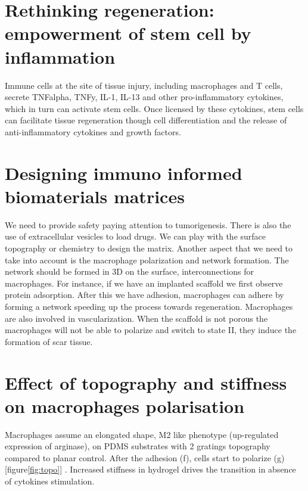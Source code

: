 \section{Rethinking regeneration: empowerment of stem cell by inflammation}
Immune cells at the site of tissue injury, including macrophages and T cells, secrete TNFalpha, TNFy, IL-1, IL-13 and other pro-inflammatory cytokines, which in turn can activate stem cells. 
Once licensed by these cytokines, stem cells can facilitate tissue regeneration though cell differentiation and the release of anti-inflammatory cytokines and growth factors.

\section{Designing immuno informed biomaterials matrices}
We need to provide safety paying attention to tumorigenesis.
There is also the use of extracellular vesicles to load drugs.
We can play with the surface topography or chemistry to design the matrix.
Another aspect that we need to take into account is the macrophage polarization and network formation.
The network should be formed in 3D on the surface, interconnections for macrophages.
For instance, if we have an implanted scaffold we first observe protein adsorption. 
After this we have adhesion, macrophages can adhere by forming a network speeding up the process towards regeneration. 
Macrophages are also involved in vascularization. 
When the scaffold is not porous the macrophages will not be able to polarize and switch to state II, they induce the formation of scar tissue.

\section{Effect of topography and stiffness on macrophages polarisation}
Macrophages assume an elongated shape, M2 like phenotype (up-regulated expression of arginase), on PDMS substrates with 2 gratings topography compared to planar control.
After the adhesion (f), cells start to polarize (g) [figure\ref{fig:topo}] .  Increased stiffness in hydrogel drives the transition in absence of cytokines stimulation. 


